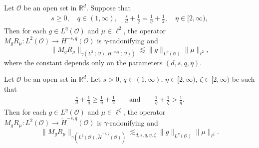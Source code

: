 \documentclass[10pt,a4paper]{amsart}
\def\R{{\mathbb R}}
\newcommand\cO{\mathcal{O}}
\newcommand{\Domm}{\mathcal{O}}
\newcommand{\wt}{\widetilde}
\begin{document}
\begin{lemma}
\label{lem:parameternew}
Let $\Domm$ be an open set in $\R^d$. 
Suppose that
\begin{align}
\label{eq:parametersnew lemma}
s\geq 0, \quad q\in (1, \infty), \quad   \frac{s}{d} + \frac{1}{q} = \frac{1}{\eta}+\frac12, \quad  \eta\in [2, \infty), 
\end{align}
Then for each $g\in L^{\eta}(\mathcal{O})$ and $\mu\in \ell^2$, the operator $M_g R_{\mu}:L^2(\mathcal{O})\to H^{-s,q}(\mathcal{O})$ is $\gamma$-radonifying and 
\[\|M_g R_{\mu}\|_{\gamma(L^2(\mathcal{O}),H^{-s,q}(\mathcal{O}))}\lesssim \|g\|_{L^\eta(\mathcal{O})} \|\mu\|_{\ell^2},\]
where the constant depends only on the parameters $(d,s,q,\eta)$. 
\end{lemma}

\begin{theorem}
\label{thm:generalONB}
Let $\Domm$ be an open set in $\R^d$.
Let $s>0$, $q\in (1, \infty)$, $\eta\in [2, \infty)$, $\zeta\in [2, \infty)$ be such that
\begin{align}
\label{eq:parametersnew}
\frac{s}{d} + \frac{1}{q} \geq \frac{1}{\eta} +\frac12\qquad \text{and}  \qquad  \frac{1}{\eta} +\frac{1}{\zeta}>\frac{1}{q}.
\end{align}
Then for each $g\in L^{\eta}(\mathcal{O})$ and $\mu \in \ell^\zeta$, the operator $M_g R_{\mu}:L^2(\mathcal{O})\to \wt{H}^{-s,q}(\mathcal{O})$ is $\gamma$-radonifying and 
\[\|M_g R_{\mu}\|_{\gamma(L^2(\mathcal{O}),\wt{H}^{-s,q}(\mathcal{O}))}
\lesssim_{d,s,q,\eta,\zeta}
         \|g\|_{L^\eta(\cO)} \|\mu\|_{\ell^\zeta}  .
\]
\end{theorem}
\end{document}
